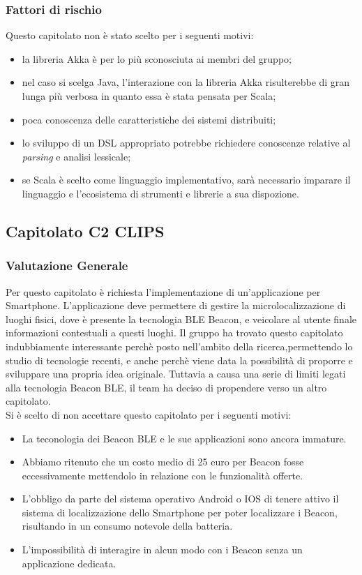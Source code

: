 \documentclass[12pt,a4paper]{article}
\begin{document}
\subsubsection{Fattori di rischio}

Questo capitolato non è stato scelto per i seguenti motivi:

\begin{itemize}
\item la libreria Akka è per lo più sconosciuta ai membri del gruppo;
\item nel caso si scelga Java, l'interazione con la libreria Akka risulterebbe di gran lunga più verbosa
in quanto essa è stata pensata per Scala;
\item poca conoscenza delle caratteristiche dei sistemi distribuiti;
\item lo sviluppo di un DSL appropriato potrebbe richiedere conoscenze relative al \textit{parsing} e 
analisi lessicale;
\item se Scala è scelto come linguaggio implementativo, sarà necessario imparare il linguaggio e l'ecosistema
di strumenti e librerie a sua dispozione.
\end{itemize}

\newpage

\subsection{Capitolato C2 CLIPS}
\subsubsection{Valutazione Generale}

Per questo capitolato è richiesta l'implementazione di un'applicazione per Smartphone. L'applicazione deve permettere di gestire la microlocalizzazione di luoghi fisici, dove è presente la tecnologia BLE Beacon, e veicolare al utente finale informazioni contestuali a questi luoghi. 
Il gruppo ha trovato questo capitolato indubbiamente interessante perchè  posto nell'ambito della ricerca,permettendo lo studio di tecnologie recenti, e anche perchè viene data la possibilità di proporre e sviluppare una propria idea originale. Tuttavia a causa una serie di limiti legati alla tecnologia Beacon BLE, il team ha deciso di propendere verso un altro capitolato.\\

Si è scelto di non accettare questo capitolato per i seguenti motivi:
\begin{itemize}
\item La teconologia dei Beacon BLE e le sue applicazioni sono ancora immature.
\item Abbiamo ritenuto che un costo medio di 25 euro per Beacon fosse eccessivamente mettendolo in relazione con le funzionalità offerte.
\item L'obbligo da parte del sistema operativo Android o IOS di tenere attivo il sistema di localizzazione dello Smartphone per poter localizzare i Beacon, risultando in un consumo notevole della batteria.
\item L'impossibilità di interagire in alcun modo con i Beacon senza un applicazione dedicata.
\end{itemize}
\end{document}
